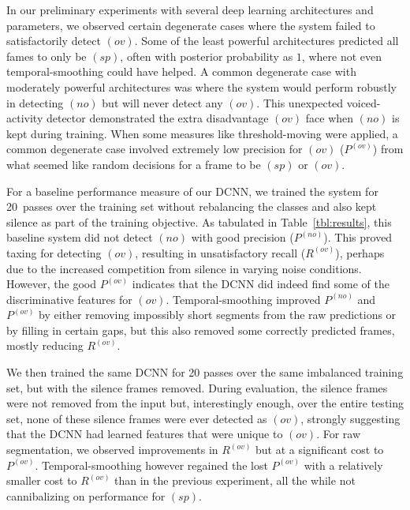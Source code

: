 \documentclass[a4paper]{article}
\begin{document}
In our preliminary experiments with several deep learning architectures and parameters,
we observed certain degenerate cases where the system failed to satisfactorily detect $(ov)$.
Some of the least powerful architectures predicted all fames to only be $(sp)$,
often with posterior probability as $1$, where not even temporal-smoothing could have helped.
A common degenerate case with moderately powerful architectures was where the system would perform robustly in detecting $(no)$ but will never detect any $(ov)$.
This unexpected voiced-activity detector demonstrated the extra disadvantage $(ov)$ face when $(no)$ is kept during training.
When some measures like threshold-moving were applied,
a common degenerate case involved extremely low precision for $(ov)$ ($P^{(ov)}$) from what seemed like random decisions for a frame to be $(sp)$ or $(ov)$.

For a baseline performance measure of our DCNN,
we trained the system for 20~passes over the training set without rebalancing the classes and also kept silence as part of the training objective.
As tabulated in Table~\ref{tbl:results},
this baseline system did not detect $(no)$ with good precision ($P^{(no)}$).
This proved taxing for detecting $(ov)$, resulting in unsatisfactory recall ($R^{(ov)}$),
perhaps due to the increased competition from silence in varying noise conditions.
However, the good $P^{(ov)}$ indicates that the DCNN did indeed find some of the discriminative features for $(ov)$.
Temporal-smoothing improved $P^{(no)}$ and $P^{(ov)}$ by either removing impossibly short segments from the raw predictions or by filling in certain gaps,
but this also removed some correctly predicted frames, mostly reducing $R^{(ov)}$.

We then trained the same DCNN for 20 passes over the same imbalanced training set,
but with the silence frames removed.
During evaluation, the silence frames were not removed from the input but,
interestingly enough, over the entire testing set,
none of these silence frames were ever detected as $(ov)$,
strongly suggesting that the DCNN had learned features that were unique to $(ov)$.
For raw segmentation, we observed improvements in $R^{(ov)}$ but at a significant cost to $P^{(ov)}$.
Temporal-smoothing however regained the lost $P^{(ov)}$ with a relatively smaller cost to $R^{(ov)}$ than in the previous experiment,
all the while not cannibalizing on performance for $(sp)$.
\end{document}
